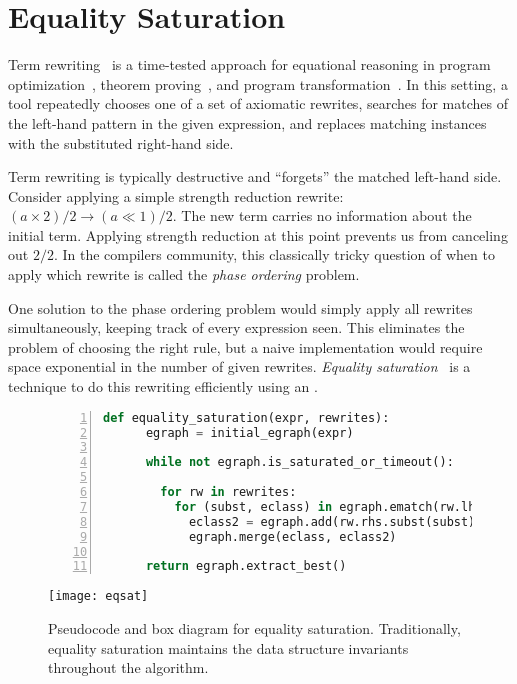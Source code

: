 \section{Equality Saturation}
\label{sec:eqsat}

Term rewriting~\cite{nachum-rewrites} is a time-tested approach
  for equational reasoning in
  program optimization~\cite{eqsat, denali},
  theorem proving~\cite{simplify, z3},
  and program transformation~\cite{graphs}.
In this setting, a tool repeatedly chooses one of a set of axiomatic rewrites,
  searches for matches of the left-hand pattern in the given
  expression, and replaces matching instances with the substituted
  right-hand side.

Term rewriting is typically destructive and ``forgets'' the matched
  left-hand side.
Consider applying a simple strength reduction rewrite:
  ${ (a \times 2) / 2 \to (a \ll 1) / 2 }$.
The new term carries no
  information about the initial term.
Applying strength reduction at this point prevents us from canceling out $2/2$.
In the compilers community, this classically tricky question of when to apply
  which rewrite is called the \textit{phase ordering} problem.

One solution to the phase ordering problem would simply apply all
  rewrites simultaneously, keeping track of every expression seen.
This eliminates the problem of choosing the right rule, but
  a naive implementation would require space exponential in the number
  of given rewrites.
\textit{Equality saturation}~\cite{eqsat, eqsat-llvm} is a technique to do this
  rewriting efficiently using an \egraph.

\begin{figure}
  \centering
  \begin{lstlisting}[language=Python, gobble=4, numbers=left, basicstyle=\small\ttfamily, xleftmargin=40mm]
    def equality_saturation(expr, rewrites):
      egraph = initial_egraph(expr)

      while not egraph.is_saturated_or_timeout():

        for rw in rewrites:
          for (subst, eclass) in egraph.ematch(rw.lhs):
            eclass2 = egraph.add(rw.rhs.subst(subst))
            egraph.merge(eclass, eclass2)

      return egraph.extract_best()
  \end{lstlisting}
  \vspace{2em}
  \texttt{[image: eqsat]}
  \caption{
    Pseudocode and box diagram for equality saturation.
    Traditionally, equality saturation maintains the \egraph data structure
      invariants throughout the algorithm.
  }
  \label{fig:eq-sat-bg}
\end{figure}

